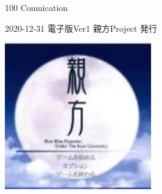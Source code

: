 \clearpage{\thispagestyle{empty}}
\begin{center}

\vspace{120pt}

\begin{sffamily}
\Large
100 Comuication
\normalsize
\end{sffamily}
\vspace{320pt}

\begin{sffamily}
2020-12-31
\hspace{5pt}
電子版Ver1
\hspace{5pt}
親方Project
\hspace{5pt}
発行
\end{sffamily}

\includegraphics[width=0.3\linewidth]{images/oyakata.png}

\end{center}
